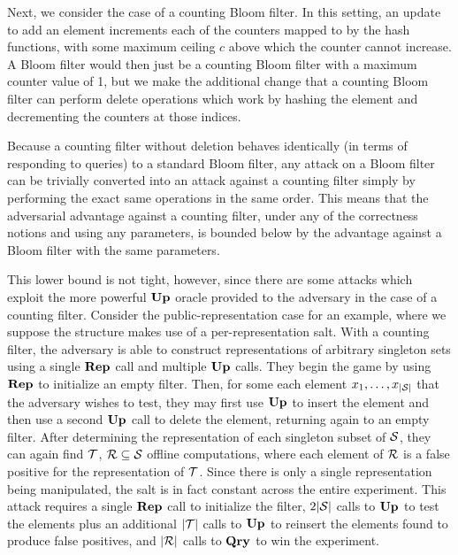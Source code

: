 Next, we consider the case of a counting Bloom filter. In this setting, an
update to add an element increments each of the counters mapped to by the hash
functions, with some maximum ceiling $c$ above which the counter cannot
increase. A Bloom filter would then just be a counting Bloom filter with a
maximum counter value of 1, but we make the additional change that a counting
Bloom filter can perform delete operations which work by hashing the element and
decrementing the counters at those indices.

Because a counting filter without deletion behaves identically (in terms of
responding to queries) to a standard Bloom filter, any attack on a Bloom filter
can be trivially converted into an attack against a counting filter simply by
performing the exact same operations in the same order. This means that the
adversarial advantage against a counting filter, under any of the correctness
notions and using any parameters, is bounded below by the advantage against a
Bloom filter with the same parameters.

This lower bound is not tight, however, since there are some attacks which
exploit the more powerful $\mathbf{Up}\hspace{0.5pt}$ oracle provided to the adversary in the case of
a counting filter. Consider the public-representation case for an example, where
we suppose the structure makes use of a per-representation salt. With a counting
filter, the adversary is able to construct representations of arbitrary
singleton sets using a single $\mathbf{Rep}\hspace{0.5pt}$ call and multiple $\mathbf{Up}\hspace{0.5pt}$ calls. They begin
the game by using $\mathbf{Rep}\hspace{0.5pt}$ to initialize an empty filter. Then, for some each
element $x_1, \ldots, x_{|\mathcal{S}|}$ that the adversary wishes to test, they may
first use $\mathbf{Up}\hspace{0.5pt}$ to insert the element and then use a second $\mathbf{Up}\hspace{0.5pt}$ call to
delete the element, returning again to an empty filter. After determining the
representation of each singleton subset of $\mathcal{S}$, they can again find $\mathcal{T}$,
$\mathcal{R} \subseteq \mathcal{S}$ offline computations, where each element of $\mathcal{R}$ is a
false positive for the representation of $\mathcal{T}$. Since there is only a single
representation being manipulated, the salt is in fact constant across the entire
experiment. This attack requires a single $\mathbf{Rep}\hspace{0.5pt}$ call to initialize the filter,
$2|\mathcal{S}|$ calls to $\mathbf{Up}\hspace{0.5pt}$ to test the elements plus an additional $|\mathcal{T}|$
calls to $\mathbf{Up}\hspace{0.5pt}$ to reinsert the elements found to produce false positives, and
$|\mathcal{R}|$ calls to $\mathbf{Qry}\hspace{0.5pt}$ to win the experiment.

